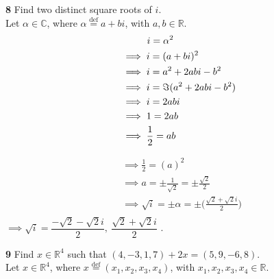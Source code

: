 \documentclass{article}
\begin{document}
\noindent \textbf{8} \hspace{3 mm} Find two distinct square roots of $i$. \color{red}\\

\indent Let $\alpha \in \mathbb{C}$, where $\alpha \stackrel{\text{def}}{=} a + bi$, with $a, b \in \mathbb{R}$.
\begin{align*}
    &\hspace{9.75 mm}i = \alpha^{2} \\
    &\implies i = (a + bi)^{2} \\
    &\implies i = a^{2} + 2abi - b^{2} \\
    &\implies i = \Im(a^{2} + 2abi - b^{2}) \\
    &\implies i = 2abi \\
    &\implies 1 = 2ab \\
    &\implies \frac{1}{2} = ab \\
\end{align*}

\begin{center}

    
\end{center}

\begin{align*}
    &\implies \frac{1}{2} = (a)^{2}\\
    &\implies a = \pm {\frac{1}{\sqrt{2}}} = \pm \frac{\sqrt{2}}{2}\\
    &\implies \sqrt{i} = \pm \alpha = \pm\Big(\frac{\sqrt{2} + \sqrt{2}i}{2}\Big)\\
\end{align*}
$\implies \sqrt{i} = \dfrac{-\sqrt{2} - \sqrt{2}i}{2}, \ \dfrac{\sqrt{2} + \sqrt{2}i}{2}$ .\\

\color{black}

\pagebreak

\noindent \textbf{9} \hspace{3 mm} Find $x \in \mathbb{R}^{4}$ such that $(4, -3, 1, 7) + 2x = (5, 9, -6, 8)$. \color{red}\\

\indent Let $x \in \mathbb{R}^{4}$, where $x \stackrel{\text{def}}{=} (x_{1}, x_{2}, x_{3}, x_{4})$, with $x_{1}, x_{2}, x_{3}, x_{4} \in \mathbb{R}$.
\end{document}
